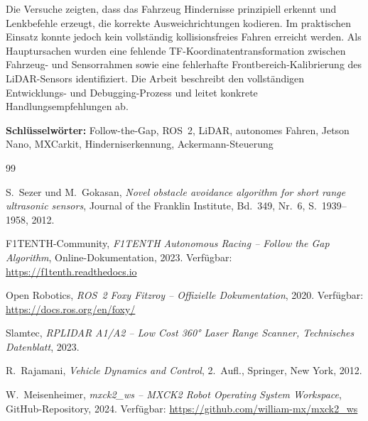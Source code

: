 \documentclass[12pt]{report}
\begin{document}
Die Versuche zeigten, dass das Fahrzeug Hindernisse prinzipiell erkennt
und Lenkbefehle erzeugt, die korrekte Ausweichrichtungen kodieren.
Im praktischen Einsatz konnte jedoch kein vollständig kollisionsfreies
Fahren erreicht werden. Als Hauptursachen wurden eine fehlende
TF-Koordinatentransformation zwischen Fahrzeug- und Sensorrahmen sowie
eine fehlerhafte Frontbereich-Kalibrierung des LiDAR-Sensors identifiziert.
Die Arbeit beschreibt den vollständigen Entwicklungs- und Debugging-Prozess
und leitet konkrete Handlungsempfehlungen ab.

\bigskip
\noindent\textbf{Schlüsselwörter:} Follow-the-Gap, ROS~2, LiDAR,
autonomes Fahren, Jetson Nano, MXCarkit, Hinderniserkennung, Ackermann-Steuerung

\setcounter{page}{2}
\tableofcontents
\newpage
\listoffigures
\newpage
\listoftables
\newpage







\begin{thebibliography}{99}

S.~Sezer und M.~Gokasan,
\textit{Novel obstacle avoidance algorithm for short range ultrasonic sensors},
Journal of the Franklin Institute, Bd.~349, Nr.~6, S.~1939--1958, 2012.

F1TENTH-Community,
\textit{F1TENTH Autonomous Racing -- Follow the Gap Algorithm},
Online-Dokumentation, 2023.
Verfügbar: \url{https://f1tenth.readthedocs.io}

Open Robotics,
\textit{ROS~2 Foxy Fitzroy -- Offizielle Dokumentation}, 2020.
Verfügbar: \url{https://docs.ros.org/en/foxy/}

Slamtec,
\textit{RPLIDAR A1/A2 -- Low Cost 360° Laser Range Scanner, Technisches Datenblatt},
2023.

R.~Rajamani,
\textit{Vehicle Dynamics and Control}, 2.~Aufl.,
Springer, New York, 2012.

W.~Meisenheimer,
\textit{mxck2\_ws -- MXCK2 Robot Operating System Workspace},
GitHub-Repository, 2024.
Verfügbar: \url{https://github.com/william-mx/mxck2_ws}

\end{thebibliography}
\end{document}
